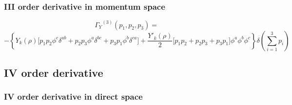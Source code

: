 \subsubsection{III order derivative in momentum space} %
\begin{equation}\label{Y3}
 {\Gamma_Y}^{(3)}(p_1, p_2, p_3) =  
\end{equation}
$$ - \left\{Y_k(\rho)\Big[p_1p_2\phi^c\delta^{ab} + p_2 p_3 \phi^a \delta^{bc} + p_3p_1\phi^b\delta^{ca}\Big] + \frac{Y'_k(\rho)}{2}\Big[p_1p_2 + p_2p_3 + p_3p_1\Big]\phi^a\phi^b\phi^c\right\}\delta\left(\sum_{i = 1}^3 p_i \right)$$



\subsection{IV order derivative}

\subsubsection{IV order derivative in direct space}

